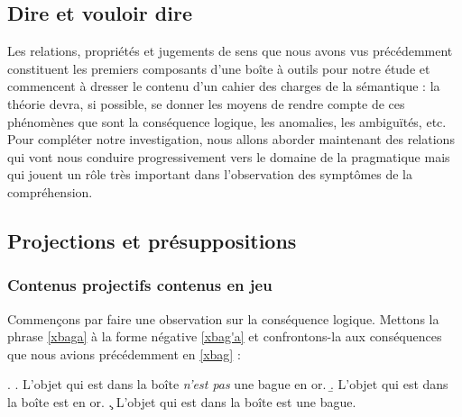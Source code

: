 \begin{refsegment}
\medskip












\section{Dire et vouloir dire}
\label{s:pragmat}

Les relations, propriétés et jugements de sens que nous avons vus précédemment constituent les premiers composants d'une boîte à outils pour notre étude et commencent à dresser le contenu d'un cahier des charges de la sémantique : la théorie devra, si possible, se donner les moyens de rendre compte de ces phénomènes que sont la conséquence logique, les anomalies, les ambiguïtés, etc.
Pour compléter notre investigation, nous allons aborder maintenant des  relations qui vont nous conduire progressivement vers le domaine de la pragmatique mais qui jouent un rôle très important dans l'observation des  symptômes de la compréhension. 

\subsection{Projections et présuppositions}
\label{s:presuppositions}


\subsubsection{Contenus projectifs {\vs} contenus en jeu}
\label{ss:projections}

Commençons par faire une observation sur la conséquence logique.
Mettons la phrase \ref{xbaga} à la forme négative \ref{xbag'a} et confrontons-la 
aux conséquences que nous avions précédemment en \ref{xbag} :

\ex. \label{xbag'} %
\a. L'objet qui est dans la boîte \emph{n'est pas} une bague en or. \label{xbag'a}
\b. L'objet qui est dans la boîte est en or. \label{xbag'b}
\c. L'objet qui est dans la boîte est une bague. \label{xbag'c}



\end{refsegment}
